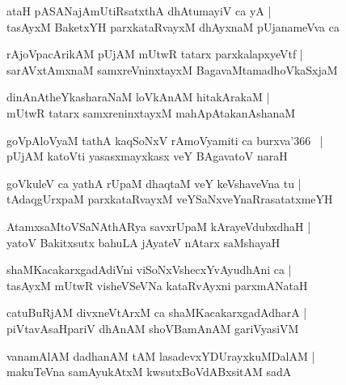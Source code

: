 \documentclass[twoside,12pt,openright]{book}
\newcounter{shloka}[chapter]
\begin{document}
\begin{shloka}%
ataH pASANajAmUtiRsatxthA dhAtumayiV ca yA |\\
tasAyxM BaketxYH parxkataRvayxM dhAyxnaM pUjanameVva ca 
\end{shloka}

\begin{shloka}%
rAjoVpacArikAM pUjAM mUtwR tatarx parxkalapxyeVtf |\\
sarAVxtAmxnaM samxreVninxtayxM BagavaMtamadhoVkaSxjaM 
\end{shloka}

\begin{shloka}%
dinAnAtheYkasharaNaM loVkAnAM hitakArakaM |\\
mUtwR tatarx samxreninxtayxM mahApAtakanAshanaM 
\end{shloka}

\begin{shloka}%
goVpAloVyaM tathA kaqSoNxV rAmoVyamiti ca burxva\char'366 ~|\\
pUjAM katoVti yasasxmayxkasx veY BAgavatoV naraH 
\end{shloka}

\begin{shloka}%
goVkuleV ca yathA rUpaM dhaqtaM veY keVshaveVna tu |\\
tAdaqgUrxpaM parxkataRvayxM veYSaNxveYnaRrasatatxmeYH 
\end{shloka}

\begin{shloka}%
AtamxsaMtoVSaNAthARya savxrUpaM kArayeVdubxdhaH |\\
yatoV Bakitxsutx bahuLA jAyateV nAtarx saMshayaH 
\end{shloka}

\begin{shloka}%
shaMKacakarxgadAdiVni viSoNxVshecxYvAyudhAni ca |\\
tasAyxM mUtwR visheVSeVNa kataRvAyxni parxmANataH 
\end{shloka}

\begin{shloka}%
catuBuRjAM divxneVtArxM ca shaMKacakarxgadAdharA |\\
piVtavAsaHpariV dhAnAM shoVBamAnAM gariVyasiVM 
\end{shloka}

\begin{shloka}%
vanamAlAM dadhanAM tAM lasadevxYDUrayxkuMDalAM |\\
makuTeVna samAyukAtxM kwsutxBoVdABxsitAM sadA 
\end{shloka}
\end{document}
